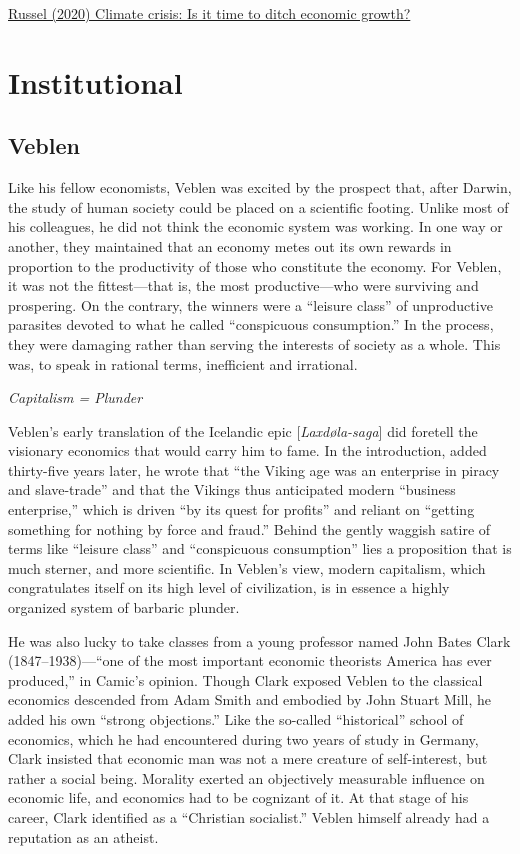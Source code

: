 \documentclass[
]{book}
\begin{document}
\href{https://www.dw.com/en/climatechange-emissions-fossilfuels-gdp-economy-renewables/a-55089013}{Russel (2020) Climate crisis: Is it time to ditch economic growth?}

\hypertarget{institutional}{%
\chapter{Institutional}\label{institutional}}

\hypertarget{veblen}{%
\section{Veblen}\label{veblen}}

Like his fellow economists, Veblen was excited by the prospect that, after Darwin, the study of human society could be placed on a scientific footing. Unlike most of his colleagues, he did not think the economic system was working. In one way or another, they maintained that an economy metes out its own rewards in proportion to the productivity of those who constitute the economy. For Veblen, it was not the fittest---that is, the most productive---who were surviving and prospering. On the contrary, the winners were a ``leisure class'' of unproductive parasites devoted to what he called ``conspicuous consumption.'' In the process, they were damaging rather than serving the interests of society as a whole. This was, to speak in rational terms, inefficient and irrational.

\emph{Capitalism = Plunder}

Veblen's early translation of the Icelandic epic {[}\emph{Laxdøla-saga}{]} did foretell the visionary economics that would carry him to fame. In the introduction, added thirty-five years later, he wrote that ``the Viking age was an enterprise in piracy and slave-trade'' and that the Vikings thus anticipated modern ``business enterprise,'' which is driven ``by its quest for profits'' and reliant on ``getting something for nothing by force and fraud.'' Behind the gently waggish satire of terms like ``leisure class'' and ``conspicuous consumption'' lies a proposition that is much sterner, and more scientific. In Veblen's view, modern capitalism, which congratulates itself on its high level of civilization, is in essence a highly organized system of barbaric plunder.

He was also lucky to take classes from a young professor named John Bates Clark (1847--1938)---``one of the most important economic theorists America has ever produced,'' in Camic's opinion. Though Clark exposed Veblen to the classical economics descended from Adam Smith and embodied by John Stuart Mill, he added his own ``strong objections.'' Like the so-called ``historical'' school of economics, which he had encountered during two years of study in Germany, Clark insisted that economic man was not a mere creature of self-interest, but rather a social being. Morality exerted an objectively measurable influence on economic life, and economics had to be cognizant of it. At that stage of his career, Clark identified as a ``Christian socialist.'' Veblen himself already had a reputation as an atheist.
\end{document}
